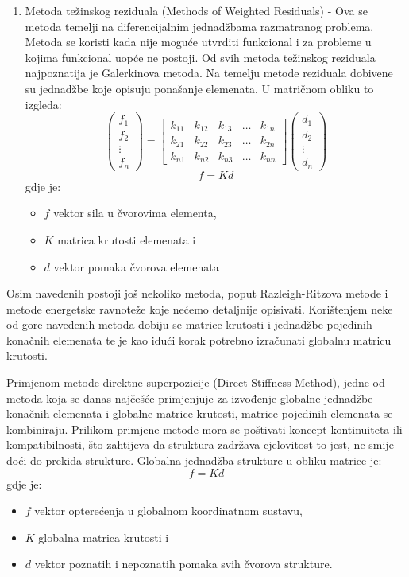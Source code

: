 \documentclass[a4paper,twoside,12pt]{memoir} %
\begin{document}
\begin{enumerate}
    \item Metoda težinskog reziduala (Methods of Weighted Residuals) -
    Ova se metoda temelji na diferencijalnim jednadžbama razmatranog problema. Metoda se koristi kada nije moguće utvrditi funkcional i za probleme u kojima funkcional uopće ne postoji. Od svih metoda težinskog reziduala najpoznatija je Galerkinova metoda. Na temelju metode reziduala dobivene su jednadžbe koje opisuju ponašanje elemenata. U matričnom obliku to izgleda:
    $$
    \begin{pmatrix} f_1 \\ f_2 \\ \vdots \\ f_n \end{pmatrix}
    =
    \begin{bmatrix}
    k_{11}       & k_{12} & k_{13} & \dots & k_{1n} \\
    k_{21}       & k_{22} & k_{23} & \dots & k_{2n} \\
    k_{n1}       & k_{n2} & k_{n3} & \dots & k_{nn}
    \end{bmatrix} 
    \begin{pmatrix} d_1 \\ d_2 \\ \vdots \\ d_n \end{pmatrix}
    $$
    $$ f = K  d $$
    gdje je:
    \begin{itemize}
        \item $f$ vektor sila u čvorovima elementa,
        \item $K$ matrica krutosti elemenata i
        \item $d$ vektor pomaka čvorova elemenata 
    \end{itemize}
\end{enumerate}
Osim navedenih postoji još nekoliko metoda, poput Razleigh-Ritzova metode i metode energetske ravnoteže koje nećemo detaljnije opisivati. Korištenjem neke od gore navedenih metoda dobiju se matrice krutosti i jednadžbe pojedinih konačnih elemenata te je kao idući korak potrebno izračunati globalnu matricu krutosti. \par

Primjenom metode direktne superpozicije (Direct Stiffness Method), jedne od metoda koja se danas najčešće primjenjuje za izvođenje globalne jednadžbe konačnih elemenata i globalne matrice krutosti, matrice pojedinih elemenata se kombiniraju. Prilikom primjene metode mora se poštivati koncept kontinuiteta ili kompatibilnosti, što zahtijeva da struktura zadržava cjelovitost to jest, ne smije doći do prekida strukture. Globalna jednadžba strukture u obliku matrice je:
\begin{equation}
\label{eq:glob_jed_strukture}
	f = K  d
\end{equation}
gdje je:
\begin{itemize}
    \item $f$ vektor opterećenja u globalnom koordinatnom sustavu,
    \item $K$ globalna matrica krutosti i
    \item $d$ vektor poznatih i nepoznatih pomaka svih čvorova strukture.
\end{itemize}
\end{document}
